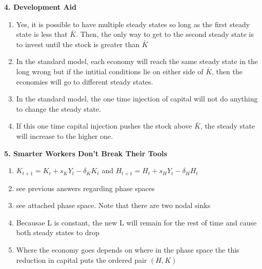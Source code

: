 \documentclass[11pt]{article}
\begin{document}
\textbf{4. Development Aid}
\begin{enumerate}[label=\alph*]
    \item Yes, it is possible to have multiple steady states so long as the first steady state is less that $\bar{K}$. Then, the only way to get to the second steady state is to invest until the stock is greater than $\bar{K}$
    \item In the standard model, each economy will reach the same steady state in the long wrong but if the intitial conditions lie on either side of $\bar{K}$, then the economies will go to different steady states.
    \item In the standard model, the one time injection of capital will not do anything to change the steady state.
    \item If this one time capital injection pushes the stock above $\bar{K}$, the steady state will increase to the higher one.
\end{enumerate}
\textbf{5. Smarter Workers Don't Break Their Tools}
\begin{enumerate}[label=\alph*]
    \item $K_{t+1} = K_t + s_KY_t - \delta_KK_t$ and $H_{t+1} = H_t + s_HY_t - \delta_HH_t$
    \item see previous answers regarding phase spaces
    \item see attached phase space. Note that there are two nodal sinks
    \item Becausae L is constant, the new L will remain for the rest of time and cause both steady states to drop
    \item Where the economy goes depends on where in the phase space the this reduction in capital puts the ordered pair $(H,K)$
\end{enumerate}
\end{document}
